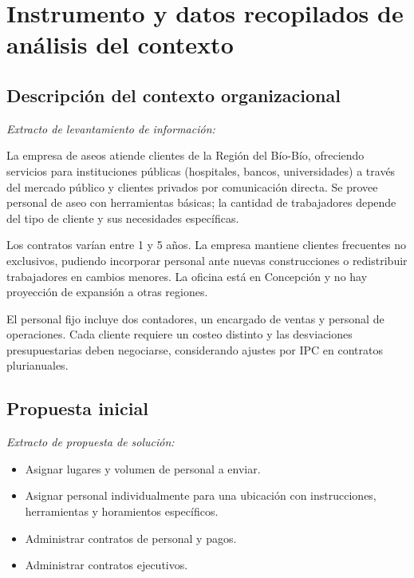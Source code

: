 \documentclass[12pt,a4paper]{report}
\begin{document}
\appendix
\chapter{Instrumento y datos recopilados de análisis del contexto}

\section{Descripción del contexto organizacional}

\textit{Extracto de levantamiento de información:}

La empresa de aseos atiende clientes de la Región del Bío-Bío, ofreciendo servicios para instituciones públicas (hospitales, bancos, universidades) a través del mercado público y clientes privados por comunicación directa. Se provee personal de aseo con herramientas básicas; la cantidad de trabajadores depende del tipo de cliente y sus necesidades específicas.

Los contratos varían entre 1 y 5 años. La empresa mantiene clientes frecuentes no exclusivos, pudiendo incorporar personal ante nuevas construcciones o redistribuir trabajadores en cambios menores. La oficina está en Concepción y no hay proyección de expansión a otras regiones.

El personal fijo incluye dos contadores, un encargado de ventas y personal de operaciones. Cada cliente requiere un costeo distinto y las desviaciones presupuestarias deben negociarse, considerando ajustes por IPC en contratos plurianuales.

\section{Propuesta inicial}

\textit{Extracto de propuesta de solución:}

\begin{itemize}
  \item Asignar lugares y volumen de personal a enviar.
  \item Asignar personal individualmente para una ubicación con instrucciones, herramientas y horamientos específicos.
  \item Administrar contratos de personal y pagos.
  \item Administrar contratos ejecutivos.
\end{itemize}
\end{document}
